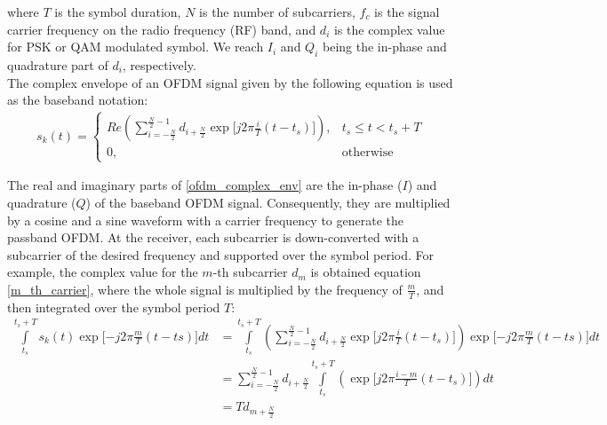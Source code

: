 where $T$ is the symbol duration, $N$ is the number of subcarriers, $f_{c}$ is the signal carrier
frequency on the radio frequency (RF) band, and $d_{i}$ is the complex value for PSK or QAM modulated symbol. We reach $I_{i}$ and $Q_{i}$ being the in-phase and quadrature part of $d_{i}$, respectively.\\
The complex envelope of an OFDM signal given by the following equation is used as the baseband notation:
\begin{equation} \label{ofdm_complex_env}
\begin{split}
s_{k}(t)=
\left\{
	\begin{array}{ll}
	Re\left( \sum\limits_{i=-\frac{N}{2}}^{\frac{N}{2}-1} d_{i+\frac{N}{2}} \exp\lbrack j2\pi\frac{i}{T}(t- t_{s})\rbrack\right) , & t_{s}\le t < t_{s} + T\\
	0, & \mbox{otherwise}
	\end{array}
\right.
\end{split}
\end{equation}

The real and imaginary parts of \ref{ofdm_complex_env} are the in-phase ($I$) and quadrature ($Q$) of the baseband OFDM signal. Consequently, they are multiplied by a cosine and a sine waveform with a carrier frequency to generate the passband OFDM. At the receiver, each subcarrier is down-converted with a subcarrier of the desired frequency and supported over the symbol period. For example, the complex value for the $m$-th subcarrier $d_{m}$ is obtained equation \ref{m_th_carrier}, where the whole signal is multiplied by the frequency of $\frac{m}{T}$, and then integrated over the symbol period $T$:
\begin{equation} \label{m_th_carrier}
\begin{split}
\int\limits_{t_{s}}^{t_{s} + T} s_{k}(t) \exp \lbrack -j2\pi \frac{m}{T} (t-ts) \rbrack dt & = \int\limits_{t_{s}}^{t_{s} + T}  \left( \sum\limits_{i=-\frac{N}{2}}^{\frac{N}{2}-1} d_{i+\frac{N}{2}} \exp\lbrack j2\pi\frac{i}{T}(t- t_{s})\rbrack\right) \exp \lbrack -j2\pi \frac{m}{T} (t-ts) \rbrack dt\\
& = \sum\limits_{i=-\frac{N}{2}}^{\frac{N}{2}-1} d_{i+\frac{N}{2}} \int\limits_{t_{s}}^{t_{s} + T}  \left( \exp\lbrack j2\pi\frac{i-m}{T}(t- t_{s})\rbrack\right) dt\\
& = Td_{m+ \frac{N}{2}}
\end{split}
\end{equation}

